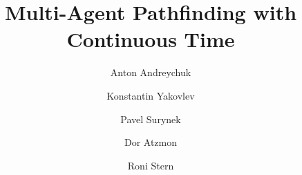 \documentclass[review]{elsarticle}
\begin{document}
\begin{frontmatter}

\title{Multi-Agent Pathfinding with Continuous Time}








\author[ras,rudn]{Anton Andreychuk}
\author[ras,hse,mipt]{Konstantin Yakovlev}
\author[cvut]{Pavel Surynek}
\author[bgu]{Dor Atzmon}
\author[bgu,parc]{Roni Stern}

\address[ras]{Federal Research Center for Computer Science and Control of Russian Academy of Sciences, Russia}
\address[hse]{National Research University Higher School of Economics, Russia}
\address[mipt]{Moscow Institute of Physics and Technology, Russia}
\address[rudn]{Peoples' Friendship University of Russia (RUDN University), Russia}
\address[bgu]{Software and Information Systems Eng., 
Ben Gurion University of the Negev, Israel}
\address[parc]{System Sciences Laboratory (SSL), Palo Alto Research Center (PARC), USA}
\address[cvut]{Faculty of Information Technology (FIT), Czech Technical University (\v{C}VUT), Czech Republic}








\end{frontmatter}
\end{document}
